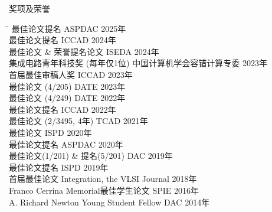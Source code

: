 
\begin{rSection}{奖项及荣誉}
\begin{tabbing}
\hspace{3.3in}\= \hspace{2.7in}\= \kill
最佳论文提名 \> ASPDAC \> { 2025年 } \\
最佳论文提名 \> ICCAD \> { 2024年 } \\
最佳论文 \& 荣誉提名论文 \> ISEDA \> { 2024年 } \\
集成电路青年科技奖 (每年仅1位) \> 中国计算机学会容错计算专委 \> { 2023年 } \\
首届最佳审稿人奖 \> ICCAD \> { 2023年 } \\
最佳论文 (4/205) \> DATE \> { 2023年 } \\
最佳论文 (4/249) \> DATE \> { 2022年 } \\
最佳论文提名 \> ICCAD \> { 2022年 } \\
最佳论文 (2/3495, 4年) \> TCAD \> { 2021年 } \\
最佳论文 \> ISPD \> { 2020年 } \\
最佳论文提名 \> ASPDAC \> { 2020年 } \\
最佳论文(1/201) \& 提名(5/201) \> DAC \> { 2019年 } \\
最佳论文提名 \> ISPD \> { 2019年 } \\
首届最佳论文 \> Integration, the VLSI Journal \> { 2018年 } \\
Franco Cerrina Memorial最佳学生论文 \> SPIE \> { 2016年 } \\
A. Richard Newton Young Student Fellow \> DAC \> { 2014年 } \\
\end{tabbing}
\end{rSection}

